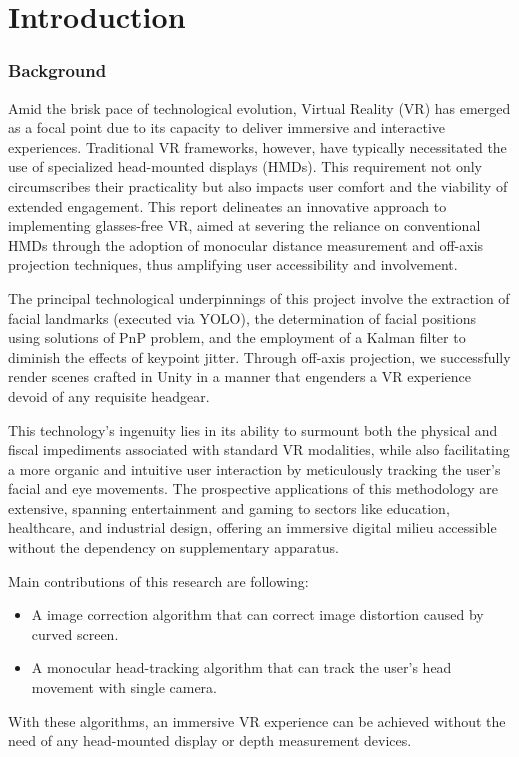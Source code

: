 \part{Introduction}

\section {Background}
Amid the brisk pace of technological evolution, Virtual Reality (VR) has emerged as a focal point due to its capacity to deliver immersive and interactive experiences. Traditional VR frameworks, however, have typically necessitated the use of specialized head-mounted displays (HMDs). This requirement not only circumscribes their practicality but also impacts user comfort and the viability of extended engagement. This report delineates an innovative approach to implementing glasses-free VR, aimed at severing the reliance on conventional HMDs through the adoption of monocular distance measurement and off-axis projection techniques, thus amplifying user accessibility and involvement.

The principal technological underpinnings of this project involve the extraction of facial  landmarks (executed via YOLO\cite{Redmon_2016_CVPR}), the determination of facial positions using solutions of PnP \cite{Wu_2006} problem, and the employment of a Kalman filter to diminish the effects of keypoint jitter. Through off-axis projection, we successfully render scenes crafted in Unity in a manner that engenders a VR experience devoid of any requisite headgear.

This technology's ingenuity lies in its ability to surmount both the physical and fiscal impediments associated with standard VR modalities, while also facilitating a more organic and intuitive user interaction by meticulously tracking the user’s facial and eye movements. The prospective applications of this methodology are extensive, spanning entertainment and gaming to sectors like education, healthcare, and industrial design, offering an immersive digital milieu accessible without the dependency on supplementary apparatus.

Main contributions of this research are following:
\begin{itemize}
    \item A image correction algorithm that can correct image distortion caused by curved screen.
    \item A monocular head-tracking algorithm that can track the user's head movement with single camera.
\end{itemize}
With these algorithms, an immersive VR experience can be achieved without the need of any head-mounted display or depth measurement devices.
